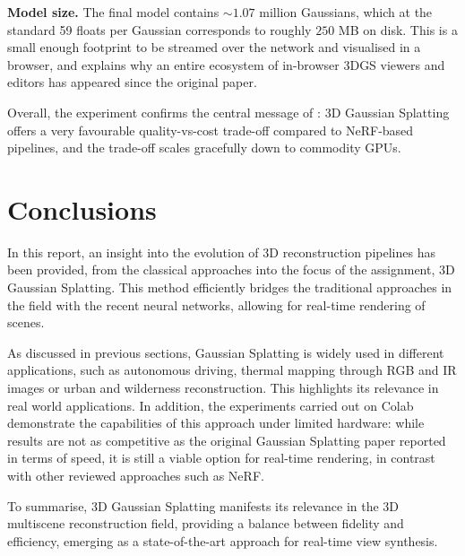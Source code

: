 \documentclass[
	a4paper, %
	10pt, %
	unnumberedsections, %
	twoside, %
]{LTJournalArticle}
\begin{document}
\textbf{Model size.} The final model contains $\sim 1.07$ million Gaussians, which at the standard 59 floats per Gaussian corresponds to roughly $250$ MB on disk. This is a small enough footprint to be streamed over the network and visualised in a browser, and explains why an entire ecosystem of in-browser 3DGS viewers and editors has appeared since the original paper.

Overall, the experiment confirms the central message of \cite{kerbl20233dgs}: 3D Gaussian Splatting offers a very favourable quality-vs-cost trade-off compared to NeRF-based pipelines, and the trade-off scales gracefully down to commodity GPUs.

\section{Conclusions}

In this report, an insight into the evolution of 3D reconstruction pipelines has been provided, from the classical approaches into the focus of the assignment, 3D Gaussian Splatting. This method efficiently bridges the traditional approaches in the field with the recent neural networks, allowing for real-time rendering of scenes.

As discussed in previous sections, Gaussian Splatting is widely used in different applications, such as autonomous driving, thermal mapping through RGB and IR images or urban and wilderness reconstruction. This highlights its relevance in real world applications. In addition, the experiments carried out on Colab demonstrate the capabilities of this approach under limited hardware: while results are not as competitive as the original Gaussian Splatting paper reported in terms of speed, it is still a viable option for real-time rendering, in contrast with other reviewed approaches such as NeRF.

To summarise, 3D Gaussian Splatting manifests its relevance in the 3D multiscene reconstruction field, providing a balance between fidelity and efficiency, emerging as a state-of-the-art approach for real-time view synthesis.  


\printbibliography %

\end{document}
